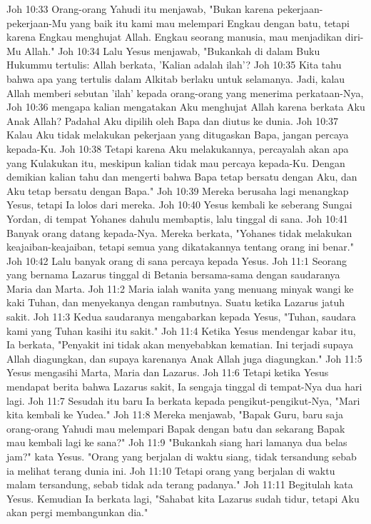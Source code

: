Joh 10:33  Orang-orang Yahudi itu menjawab, "Bukan karena pekerjaan-pekerjaan-Mu yang baik itu kami mau melempari Engkau dengan batu, tetapi karena Engkau menghujat Allah. Engkau seorang manusia, mau menjadikan diri-Mu Allah."
Joh 10:34  Lalu Yesus menjawab, "Bukankah di dalam Buku Hukummu tertulis: Allah berkata, 'Kalian adalah ilah'?
Joh 10:35  Kita tahu bahwa apa yang tertulis dalam Alkitab berlaku untuk selamanya. Jadi, kalau Allah memberi sebutan 'ilah' kepada orang-orang yang menerima perkataan-Nya,
Joh 10:36  mengapa kalian mengatakan Aku menghujat Allah karena berkata Aku Anak Allah? Padahal Aku dipilih oleh Bapa dan diutus ke dunia.
Joh 10:37  Kalau Aku tidak melakukan pekerjaan yang ditugaskan Bapa, jangan percaya kepada-Ku.
Joh 10:38  Tetapi karena Aku melakukannya, percayalah akan apa yang Kulakukan itu, meskipun kalian tidak mau percaya kepada-Ku. Dengan demikian kalian tahu dan mengerti bahwa Bapa tetap bersatu dengan Aku, dan Aku tetap bersatu dengan Bapa."
Joh 10:39  Mereka berusaha lagi menangkap Yesus, tetapi Ia lolos dari mereka.
Joh 10:40  Yesus kembali ke seberang Sungai Yordan, di tempat Yohanes dahulu membaptis, lalu tinggal di sana.
Joh 10:41  Banyak orang datang kepada-Nya. Mereka berkata, "Yohanes tidak melakukan keajaiban-keajaiban, tetapi semua yang dikatakannya tentang orang ini benar."
Joh 10:42  Lalu banyak orang di sana percaya kepada Yesus.
Joh 11:1  Seorang yang bernama Lazarus tinggal di Betania bersama-sama dengan saudaranya Maria dan Marta.
Joh 11:2  Maria ialah wanita yang menuang minyak wangi ke kaki Tuhan, dan menyekanya dengan rambutnya. Suatu ketika Lazarus jatuh sakit.
Joh 11:3  Kedua saudaranya mengabarkan kepada Yesus, "Tuhan, saudara kami yang Tuhan kasihi itu sakit."
Joh 11:4  Ketika Yesus mendengar kabar itu, Ia berkata, "Penyakit ini tidak akan menyebabkan kematian. Ini terjadi supaya Allah diagungkan, dan supaya karenanya Anak Allah juga diagungkan."
Joh 11:5  Yesus mengasihi Marta, Maria dan Lazarus.
Joh 11:6  Tetapi ketika Yesus mendapat berita bahwa Lazarus sakit, Ia sengaja tinggal di tempat-Nya dua hari lagi.
Joh 11:7  Sesudah itu baru Ia berkata kepada pengikut-pengikut-Nya, "Mari kita kembali ke Yudea."
Joh 11:8  Mereka menjawab, "Bapak Guru, baru saja orang-orang Yahudi mau melempari Bapak dengan batu dan sekarang Bapak mau kembali lagi ke sana?"
Joh 11:9  "Bukankah siang hari lamanya dua belas jam?" kata Yesus. "Orang yang berjalan di waktu siang, tidak tersandung sebab ia melihat terang dunia ini.
Joh 11:10  Tetapi orang yang berjalan di waktu malam tersandung, sebab tidak ada terang padanya."
Joh 11:11  Begitulah kata Yesus. Kemudian Ia berkata lagi, "Sahabat kita Lazarus sudah tidur, tetapi Aku akan pergi membangunkan dia."
